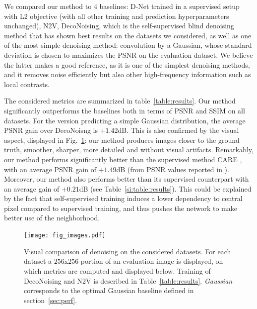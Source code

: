 \documentclass{article}
\begin{document}
We compared our method to 4 baselines: D-Net trained in a supervised setup with L2 objective (with all other training and prediction hyperparameters unchanged), N2V, DecoNoising, which is the self-supervised blind denoising method that has shown best results on the datasets we considered, as well as one of the most simple denoising method: convolution by a Gaussian, whose standard deviation is chosen to maximizes the PSNR on the evaluation dataset.
We believe the latter makes a good reference, as it is one of the simplest denoising methods, and it removes noise efficiently but also other high-frequency information such as local contrasts.

The considered metrics are summarized in table~\ref{table:results}.
Our method significantly outperforms the baselines both in terms of PSNR and SSIM on all datasets.
For the version predicting a simple Gaussian distribution, the average PSNR gain over DecoNoisng is $+1.42$dB.
This is also confirmed by the visual aspect, displayed in Fig.~\ref{fig:images}: our method produces images closer to the ground truth, smoother, sharper, more detailed and without visual artifacts.
Remarkably, our method performs significantly better than the supervised method CARE \cite{weigert2017content}, with an average PSNR gain of $+1.49$dB (from PSNR values reported in \cite{goncharova2020}).
Moreover, our method also performs better than its supervised counterpart with an average gain of $+0.21$dB (see Table~\ref{si:table:results}).
This could be explained by the fact that self-supervised training induces a lower dependency to central pixel compared to supervised training, and thus pushes the network to make better use of the neighborhood.

\begin{figure}[!htbp]
\vskip -0.1in
\texttt{[image: fig\_images.pdf]}
\caption{Visual comparison of denoising on the considered datasets. For each dataset a $256$x$256$ portion of an evaluation image is displayed, on which metrics are computed and displayed below. Training of DecoNoising and N2V is described in Table~\ref{table:results}. \textit{Gaussian} corresponds to the optimal Gaussian baseline defined in section~\ref{sec:perf}.}
\label{fig:images}
\end{figure}
\end{document}
